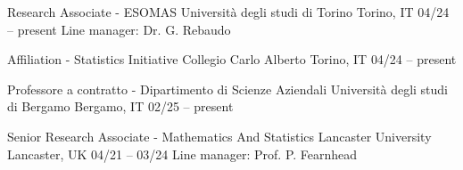 


\begin{cventries}

  \cventry
    {Research Associate - ESOMAS}
    {Università degli studi di Torino}
    {Torino, IT}
    {04\slash 24 -- present}
    {Line manager: Dr. G. Rebaudo}
    
  \cventry
    {Affiliation - Statistics Initiative}
    {Collegio Carlo Alberto}
    {Torino, IT}
    {04\slash 24 -- present}
    {}

  \cventry
    {Professore a contratto - Dipartimento di Scienze Aziendali}
    {Università degli studi di Bergamo }
    {Bergamo, IT}
    {02\slash 25 -- present}
    {}
    
  \cventry
    {Senior Research Associate - Mathematics And Statistics}
    {Lancaster University}
    {Lancaster, UK}
    {04\slash 21 -- 03\slash 24}
    {Line manager: Prof. P. Fearnhead}

\end{cventries}
